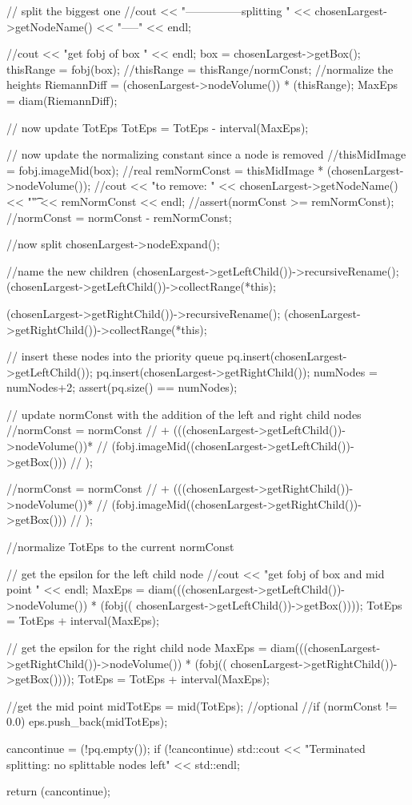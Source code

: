 \begin{DoxyCode}
{{    // split the biggest one
    //cout << "---------------splitting " << chosenLargest->getNodeName() <<
       "-----" << endl;
    
    //cout << "get fobj of box " << endl;
    box = chosenLargest->getBox();
    thisRange = fobj(box);
    //thisRange = thisRange/normConst; //normalize the heights
    RiemannDiff = (chosenLargest->nodeVolume()) * (thisRange);
    MaxEps = diam(RiemannDiff);
    
    // now update TotEps
    TotEps = TotEps - interval(MaxEps);
    
     // now update the normalizing constant since a node is removed
     //thisMidImage = fobj.imageMid(box);
     //real remNormConst = thisMidImage * (chosenLargest->nodeVolume());
     //cout << "to remove: " << chosenLargest->getNodeName() << "\t" <<
       remNormConst << endl;
     //assert(normConst >= remNormConst);
     //normConst = normConst - remNormConst;
     
     //now split
    chosenLargest->nodeExpand();
    
    //name the new children
    (chosenLargest->getLeftChild())->recursiveRename();
    (chosenLargest->getLeftChild())->collectRange(*this);

    (chosenLargest->getRightChild())->recursiveRename();
    (chosenLargest->getRightChild())->collectRange(*this);
    
    // insert these nodes into the priority queue
    pq.insert(chosenLargest->getLeftChild());
    pq.insert(chosenLargest->getRightChild());
    numNodes = numNodes+2;
    assert(pq.size() == numNodes);
    
    // update normConst with the addition of the left and right child nodes
    //normConst = normConst 
    //    + (((chosenLargest->getLeftChild())->nodeVolume())* 
    //       (fobj.imageMid((chosenLargest->getLeftChild())->getBox()))
    //      );

    //normConst = normConst 
    //    + (((chosenLargest->getRightChild())->nodeVolume())* 
    //       (fobj.imageMid((chosenLargest->getRightChild())->getBox()))
    //      );

    //normalize TotEps to the current normConst

    
    // get the epsilon for the left child node
    //cout << "get fobj of box and mid point " << endl;
    MaxEps = diam(((chosenLargest->getLeftChild())->nodeVolume()) * (fobj((
      chosenLargest->getLeftChild())->getBox())));
    TotEps = TotEps + interval(MaxEps);

    // get the epsilon for the right child node
    MaxEps = diam(((chosenLargest->getRightChild())->nodeVolume()) * (fobj((
      chosenLargest->getRightChild())->getBox())));
    TotEps = TotEps + interval(MaxEps);

    //get the mid point
    midTotEps = mid(TotEps);
    //optional
    //if (normConst != 0.0) 
    eps.push_back(midTotEps); 

    cancontinue = (!pq.empty());
    if (!cancontinue)
       std::cout << "Terminated splitting: no splittable nodes left"
          << std::endl;
  }
    return (cancontinue);
}
\end{DoxyCode}
